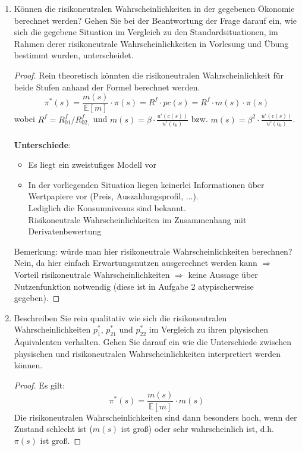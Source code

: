 \documentclass[12pt]{extreport} %
\theoremstyle{named}
\theoremstyle{nnamed}
\theoremstyle{itshape}
\theoremstyle{normal}
\begin{document}
\begin{enumerate}
\begin{proof}
		\end{proof}
	\item Können die risikoneutralen Wahrscheinlichkeiten in der gegebenen Ökonomie berechnet werden? Gehen Sie bei der Beantwortung der Frage darauf ein, wie sich die gegebene Situation im Vergleich zu den Standardsituationen, im Rahmen derer risikoneutrale Wahrscheinlichkeiten in Vorlesung und Übung bestimmt wurden, unterscheidet.
		\begin{proof}
			Rein theoretisch könnten die risikoneutralen Wahrscheinlichkeit für beide Stufen anhand der Formel berechnet werden.
			$$ \pi^*(s) = \frac{m(s)}{\mathbb{E}[m]} \cdot \pi(s) = R^f \cdot pc(s) = R^f \cdot m(s) \cdot \pi(s) $$
			wobei $R^f = R^f_{01}/R_{02,}^f$ und $m(s) = \beta \cdot \frac{u'(c(s))}{u'(c_0)}$ bzw. $m(s)= \beta ^2\cdot \frac{u'(c(s))}{u'(c_0)}$. ~\\
			\textbf{Unterschiede}:
			\begin{itemize}
				\item Es liegt ein zweistufiges Modell vor
				\item In der vorliegenden Situation liegen keinerlei Informationen über Wertpapiere vor (Preis, Auszahlungsprofil, $\dotsc$). ~\\
					Lediglich die Konsumniveaus sind bekannt. ~\\
					Risikoneutrale Wahrscheinlichkeiten im Zusammenhang mit Derivatenbewertung
			\end{itemize} 
			Bemerkung: würde man hier risikoneutrale Wahrscheinlichkeiten berechnen? Nein, da hier einfach Erwartungsnutzen ausgerechnet werden kann $\Rightarrow$ Vorteil risikoneutrale Wahrscheinlichkeiten $\Rightarrow$ keine Aussage über Nutzenfunktion notwendig (diese ist in Aufgabe 2 atypischerweise gegeben).
		\end{proof}
	\item Beschreiben Sie rein qualitativ wie sich die risikoneutralen Wahrscheinlichkeiten $p_1^*$, $p_{21}^*$ und $p_{22}^*$ im Vergleich zu ihren physischen Äquivalenten verhalten. Gehen Sie darauf ein wie die Unterschiede zwischen physischen und risikoneutralen Wahrscheinlichkeiten interpretiert werden können.
		\begin{proof} 
			Es gilt:
			$$ \pi^*(s) = \frac{m(s)}{\mathbb{E}[m] }\cdot m(s) $$
			Die risikoneutralen Wahrscheinlichkeiten sind dann besonders hoch, wenn der Zustand schlecht ist ($m(s)$ ist groß) oder sehr wahrscheinlich ist, d.h. $\pi(s)$ ist groß.
		\end{proof}
\end{enumerate}

\renewcommand{\indexname}{Stichwortverzeichnis}
\printindex
\end{document}

